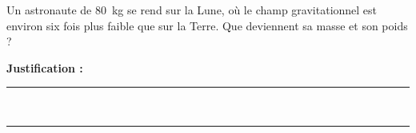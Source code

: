Un astronaute de \qty{80}{kg} se rend sur la Lune, où le champ gravitationnel est environ six fois plus faible que sur la Terre. Que deviennent sa masse et son poids ?

\choices

\noindent\textbf{Justification :} \hrulefill \\[2.5ex]
\rule{\linewidth}{0.4pt} \\[2.5ex]
\rule{\linewidth}{0.4pt}
\vfill
